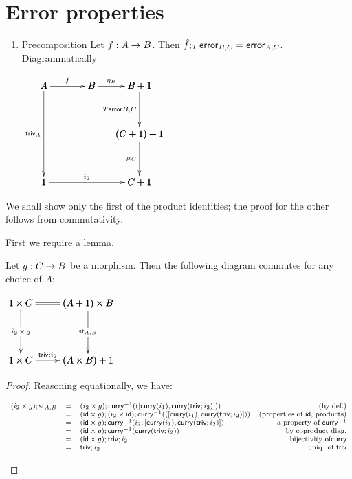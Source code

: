 \documentclass{article}[12pt]
\begin{document}
  \section{Error properties}
  \begin{enumerate}
  \item Precomposition
    Let $f : A \rightarrow B$. Then $\hat{f} ;_T \mathsf{error}_{B,C} = \mathsf{error}_{A,C}$.
    Diagrammatically
    \begin{center}
      \begin{math}
        \bfig
        \node A(0,1000)[A]%
        \node 1(0,0)[1]%
        \node Cp1(1000,0)[C+1]%
        \node B(500,1000)[B]%
        \node Bp1(1000,1000)[B+1]%
        \node Cp1p1(1000,500)[(C+1)+1]%
        \arrow[A`1;\triv_A]%
        \arrow[1`Cp1;i_2]%
        \arrow[A`B;f]%
        \arrow[B`Bp1;\eta_B]%
        \arrow[Bp1`Cp1p1;T\error{B,C}]%
        \arrow[Cp1p1`Cp1;\mu_C]%
        \efig
      \end{math}
    \end{center}
  \end{enumerate}
We shall show only the first of the product identities; the proof for the other
follows from commutativity.

First we require a lemma.

\begin{lemma}
  Let $g : C \rightarrow B$ be a morphism. Then the following diagram commutes for any choice of $A$:
  \begin{center}
    \begin{math}
      \bfig
      \square|amma|/=`->`->`->/<700,600>[1 \times C`(A + 1) \times B`1 \times C`(A \times B) + 1;`i_2 \, \times \, g`\st_{A,B}`\triv;i_2]%
      \efig
    \end{math}
  \end{center}
\end{lemma}
\begin{proof}
  Reasoning equationally, we have:
  \begin{center}
    \begin{math} \footnotesize
    \begin{array}{rllr}
      (i_2 \times g) ; \st_{A,B} & = & (i_2 \times g) ; \curryinv{([\curry{i_1}, \curry{\triv;i_2}])} & \text{(by def.)} \\
      & = & (\id \times g) ; (i_2 \times \id) ; \curryinv{([\curry{i_1}, \curry{\triv;i_2}])} & \text{(properties of } \id \text{, products)} \\
      & = & (\id \times g) ; \curryinv{i_2 ; [\curry{i_1}, \curry{\triv;i_2}]} & \text{a property of } \mathsf{curry}^{-1} \\
      & = & (\id \times g) ; \curryinv{\curry{\triv; i_2}} & \text{by coproduct diag.} \\
      & = & (\id \times g) ; \triv ; i_2 & \text{bijectivity of} \mathsf{curry} \\
      & = & \triv ; i_2 & \text{uniq. of } \triv \\
    \end{array}
    \end{math}
  \end{center}
\end{proof}
\end{document}
